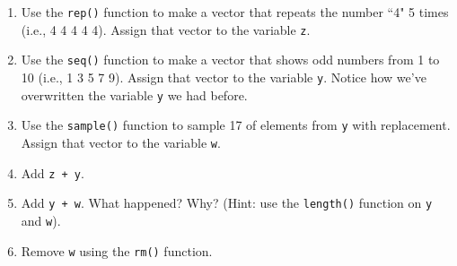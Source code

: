 \documentclass[answers]{exam}
\begin{document}
\begin{enumerate}
\item Use the \texttt{rep()} function to make a vector that repeats the number ``4" 5 times (i.e., 4 4 4 4 4). Assign that vector to the variable \texttt{z}.
\item Use the \texttt{seq()} function to make a vector that shows odd numbers from 1 to 10 (i.e., 1 3 5 7 9). Assign that vector to the variable \texttt{y}. Notice how we've overwritten the variable \texttt{y} we had before.
\item Use the \texttt{sample()} function to sample 17 of elements from \texttt{y} with replacement. Assign that vector to the variable \texttt{w}. 
\item Add \texttt{z + y}.
\item Add \texttt{y + w}. What happened? Why? (Hint: use the \texttt{length()} function on \texttt{y} and \texttt{w}).
\item Remove \texttt{w} using the \texttt{rm()} function.
\end{enumerate}
\end{document}
